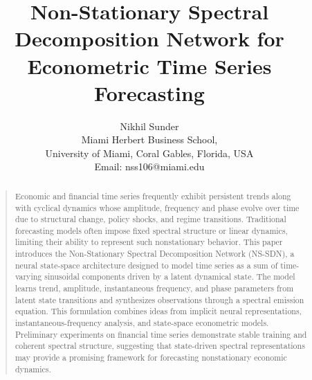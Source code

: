 \documentclass[letterpaper]{article}
\title{Non-Stationary Spectral Decomposition Network for Econometric Time Series Forecasting}
\author{Nikhil Sunder\\
Miami Herbert Business School,\\
University of Miami, Coral Gables, Florida, USA\\
Email: nss106@miami.edu}
\begin{document}
\maketitle

\begin{abstract}
\begin{quote}
Economic and financial time series frequently exhibit persistent trends along with cyclical dynamics whose amplitude, frequency and phase evolve over time due to structural change, policy shocks, and regime transitions. Traditional forecasting models often impose fixed spectral structure or linear dynamics, limiting their ability to represent such nonstationary behavior. This paper introduces the Non-Stationary Spectral Decomposition Network (NS-SDN), a neural state-space architecture designed to model time series as a sum of time-varying sinusoidal components driven by a latent dynamical state. The model learns trend, amplitude, instantaneous frequency, and phase parameters from latent state transitions and synthesizes observations through a spectral emission equation. This formulation combines ideas from implicit neural representations, instantaneous-frequency analysis, and state-space econometric models. Preliminary experiments on financial time series demonstrate stable training and coherent spectral structure, suggesting that state-driven spectral representations may provide a promising framework for forecasting nonstationary economic dynamics.
\end{quote}
\end{abstract}













\end{document}
